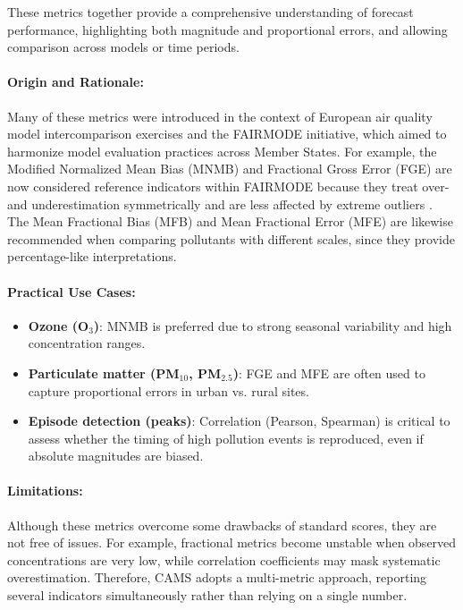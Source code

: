 These metrics together provide a comprehensive understanding of forecast performance, highlighting both magnitude and proportional errors, and allowing comparison across models or time periods.



\paragraph{Origin and Rationale:}
Many of these metrics were introduced in the context of European air quality model intercomparison exercises and the FAIRMODE initiative, which aimed to harmonize model evaluation practices across Member States. For example, the Modified Normalized Mean Bias (MNMB) and Fractional Gross Error (FGE) are now considered reference indicators within FAIRMODE because they treat over- and underestimation symmetrically and are less affected by extreme outliers \cite{CAMSreport}. The Mean Fractional Bias (MFB) and Mean Fractional Error (MFE) are likewise recommended when comparing pollutants with different scales, since they provide percentage-like interpretations.

\paragraph{Practical Use Cases:}
\begin{itemize}
	\item \textbf{Ozone (O$_3$)}: MNMB is preferred due to strong seasonal variability and high concentration ranges.
	\item \textbf{Particulate matter (PM$_{10}$, PM$_{2.5}$)}: FGE and MFE are often used to capture proportional errors in urban vs. rural sites.
	\item \textbf{Episode detection (peaks)}: Correlation (Pearson, Spearman) is critical to assess whether the timing of high pollution events is reproduced, even if absolute magnitudes are biased.
\end{itemize}

\paragraph{Limitations:}
Although these metrics overcome some drawbacks of standard scores, they are not free of issues. For example, fractional metrics become unstable when observed concentrations are very low, while correlation coefficients may mask systematic overestimation. Therefore, CAMS adopts a multi-metric approach, reporting several indicators simultaneously rather than relying on a single number.


